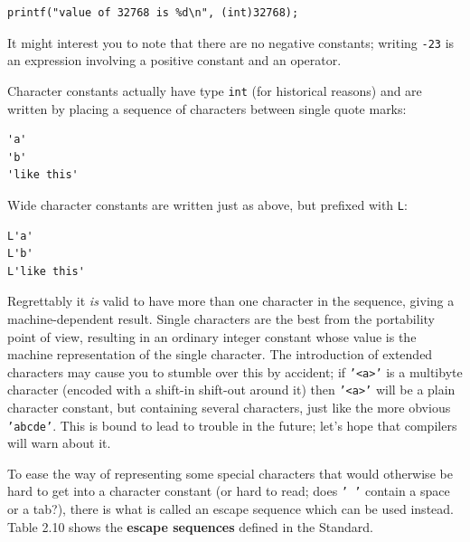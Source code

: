    \begin{Verbatim}
printf("value of 32768 is %d\n", (int)32768);
\end{Verbatim}

   It might interest you to note that there are no negative constants;
    writing \texttt{-23} is an expression involving a positive
    constant and an operator.


   Character constants actually have type \texttt{int} (for historical
    reasons) and are written by placing a sequence of characters between
    single quote marks:


   \begin{Verbatim}
'a'
'b'
'like this'
\end{Verbatim}

   Wide character constants are written just as above, but prefixed
    with \texttt{L}:


   \begin{Verbatim}
L'a'
L'b'
L'like this'
\end{Verbatim}

   Regrettably it \textit{is} valid to have more than one character in the
    sequence, giving a machine-dependent result. Single characters are the
    best from the portability point of view, resulting in an ordinary integer
    constant whose value is the machine representation of the single
    character. The introduction of extended characters may cause you to
    stumble over this by accident; if \texttt{'<a>'} is a
    multibyte character (encoded with a shift-in shift-out around it) then
    \texttt{'<a>'} will be a plain character constant, but
    containing several characters, just like the more obvious
    \texttt{'abcde'}. This is bound to lead to trouble in the future;
    let's hope that compilers will warn about it.


   To ease the way of representing some special characters that would
    otherwise be hard to get into a character constant (or hard to read; does
    \texttt{' '} contain a space or a tab?), there is what is called
    an escape sequence which can be used instead. Table 2.10
    shows the \textbf{escape sequences} defined in the Standard.


